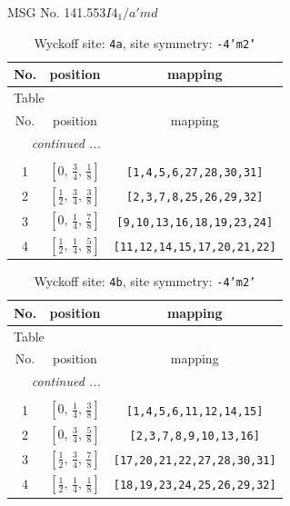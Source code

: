 \documentclass[fleqn,8pt]{jsarticle}
\begin{document}
\setcounter{MaxMatrixCols}{32}

\renewcommand{\tablename}{Table~}
\renewcommand{\figurename}{Figure~}
\begin{center}
\LARGE
MSG No. 141.553\quad$I4_{1}/a'md$
\end{center}
\renewcommand{\arraystretch}{1.2}
\begin{longtable}{ccc}
\caption{Wyckoff site: {\tt 4a}, site symmetry: {\tt -4'm2'}}
 \\
 \hline \hline
No. & position & mapping \\ \hline \endfirsthead

\multicolumn{2}{l}{\tablename\ \thetable{}} \\
 \hline \hline
No. & position & mapping \\ \hline \endhead

 \hline \hline
\multicolumn{2}{r}{\footnotesize\it continued ...} \\ \endfoot

 \hline \hline
\multicolumn{2}{r}{} \\ \endlastfoot

1 & $\left[ 0,\, \frac{3}{4},\, \frac{1}{8} \right]$ & {\tt [1,4,5,6,27,28,30,31]} \\ \hline
2 & $\left[ \frac{1}{2},\, \frac{3}{4},\, \frac{3}{8} \right]$ & {\tt [2,3,7,8,25,26,29,32]} \\ \hline
3 & $\left[ 0,\, \frac{1}{4},\, \frac{7}{8} \right]$ & {\tt [9,10,13,16,18,19,23,24]} \\ \hline
4 & $\left[ \frac{1}{2},\, \frac{1}{4},\, \frac{5}{8} \right]$ & {\tt [11,12,14,15,17,20,21,22]} \\
\end{longtable}
\renewcommand{\arraystretch}{1.2}
\begin{longtable}{ccc}
\caption{Wyckoff site: {\tt 4b}, site symmetry: {\tt -4'm2'}}
 \\
 \hline \hline
No. & position & mapping \\ \hline \endfirsthead

\multicolumn{2}{l}{\tablename\ \thetable{}} \\
 \hline \hline
No. & position & mapping \\ \hline \endhead

 \hline \hline
\multicolumn{2}{r}{\footnotesize\it continued ...} \\ \endfoot

 \hline \hline
\multicolumn{2}{r}{} \\ \endlastfoot

1 & $\left[ 0,\, \frac{1}{4},\, \frac{3}{8} \right]$ & {\tt [1,4,5,6,11,12,14,15]} \\ \hline
2 & $\left[ 0,\, \frac{3}{4},\, \frac{5}{8} \right]$ & {\tt [2,3,7,8,9,10,13,16]} \\ \hline
3 & $\left[ \frac{1}{2},\, \frac{3}{4},\, \frac{7}{8} \right]$ & {\tt [17,20,21,22,27,28,30,31]} \\ \hline
4 & $\left[ \frac{1}{2},\, \frac{1}{4},\, \frac{1}{8} \right]$ & {\tt [18,19,23,24,25,26,29,32]} \\
\end{longtable}
\end{document}
